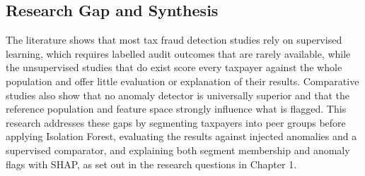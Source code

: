\subsection{Research Gap and Synthesis}

The literature shows that most tax fraud detection studies rely on supervised learning, which requires labelled audit outcomes that are rarely available, while the unsupervised studies that do exist score every taxpayer against the whole population and offer little evaluation or explanation of their results. Comparative studies also show that no anomaly detector is universally superior and that the reference population and feature space strongly influence what is flagged. This research addresses these gaps by segmenting taxpayers into peer groups before applying Isolation Forest, evaluating the results against injected anomalies and a supervised comparator, and explaining both segment membership and anomaly flags with SHAP, as set out in the research questions in Chapter 1.
